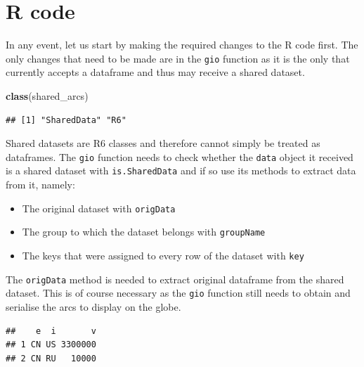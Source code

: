 \documentclass[
]{krantz}
\makeatletter
\newenvironment{Shaded}{\begin{snugshade}}{\end{snugshade}}
\newcommand{\CommentTok}[1]{\textcolor[rgb]{0.37,0.37,0.37}{\textit{#1}}}
\newcommand{\KeywordTok}[1]{\textcolor[rgb]{0.27,0.27,0.27}{\textbf{#1}}}
\newcommand{\NormalTok}[1]{#1}
\newcommand{\OperatorTok}[1]{\textcolor[rgb]{0.43,0.43,0.43}{\textbf{#1}}}
\providecommand{\tightlist}{%
  \setlength{\itemsep}{0pt}\setlength{\parskip}{0pt}}
\newenvironment{kframe}{%
\medskip{}
\setlength{\fboxsep}{.8em}
 \def\at@end@of@kframe{}%
 \ifinner\ifhmode%
  \def\at@end@of@kframe{\end{minipage}}%
  \begin{minipage}{\columnwidth}%
 \fi\fi%
 \def\FrameCommand##1{\hskip\@totalleftmargin \hskip-\fboxsep
 \colorbox{shadecolor}{##1}\hskip-\fboxsep
     \hskip-\linewidth \hskip-\@totalleftmargin \hskip\columnwidth}%
 \MakeFramed {\advance\hsize-\width
   \@totalleftmargin\z@ \linewidth\hsize
   \@setminipage}}%
 {\par\unskip\endMakeFramed%
 \at@end@of@kframe}
\renewenvironment{Shaded}{\begin{kframe}}{\end{kframe}}
\makeatother
\begin{document}
\hypertarget{linking-widgets-r}{%
\section{R code}\label{linking-widgets-r}}

In any event, let us start by making the required changes to the R code first. The only changes that need to be made are in the \texttt{gio} function as it is the only that currently accepts a dataframe and thus may receive a shared dataset.

\begin{Shaded}
\begin{Highlighting}[]
\KeywordTok{class}\NormalTok{(shared\_arcs)}
\end{Highlighting}
\end{Shaded}

\begin{verbatim}
## [1] "SharedData" "R6"
\end{verbatim}

Shared datasets are R6 classes and therefore cannot simply be treated as dataframes. The \texttt{gio} function needs to check whether the \texttt{data} object it received is a shared dataset with \texttt{is.SharedData} and if so use its methods to extract data from it, namely:

\begin{itemize}
\tightlist
\item
  The original dataset with \texttt{origData}
\item
  The group to which the dataset belongs with \texttt{groupName}
\item
  The keys that were assigned to every row of the dataset with \texttt{key}
\end{itemize}

The \texttt{origData} method is needed to extract original dataframe from the shared dataset. This is of course necessary as the \texttt{gio} function still needs to obtain and serialise the arcs to display on the globe.

\begin{Shaded}
\end{Shaded}

\begin{verbatim}
##    e  i       v
## 1 CN US 3300000
## 2 CN RU   10000
\end{verbatim}
\end{document}
